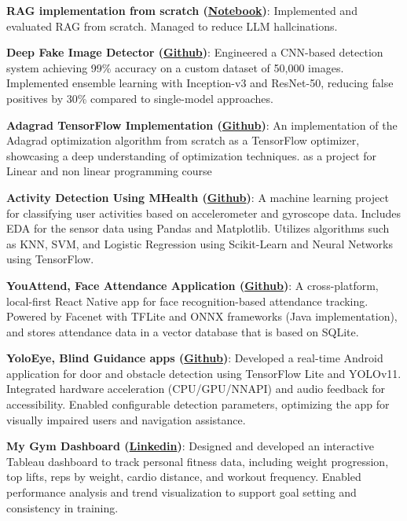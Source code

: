 \documentclass[letterpaper,11pt]{article}
\newcommand{\resumeItem}[2]{
  \item\small{
    \textbf{#1}{: #2 \vspace{-2pt}}
  }
}
\newcommand{\resumeSubItem}[2]{\resumeItem{#1}{#2}\vspace{-4pt}}
\begin{document}
 \resumeSubItem{RAG implementation from scratch (\href{https://colab.research.google.com/drive/1INoDabdT-n-vB4g11ZrA1D2VVvQX-yIs?usp=sharing}{Notebook})}
      {Implemented and evaluated RAG from scratch. Managed to reduce  LLM hallcinations.}

    \resumeSubItem{Deep Fake Image Detector (\href{https://github.com/AhmedFoda54/Deep-Fake-Classification}{Github})}
      {Engineered a CNN-based detection system achieving 99\% accuracy on a custom dataset of 50,000 images. Implemented ensemble learning with Inception-v3 and ResNet-50, reducing false positives by 30\% compared to single-model approaches.}
      

     \resumeSubItem{Adagrad TensorFlow Implementation (\href{https://github.com/marksamfd/AdaGrad-Math-303}{Github})}
      {An implementation of the Adagrad optimization algorithm from scratch as a TensorFlow optimizer, showcasing a deep understanding of optimization techniques. as a project for Linear and non linear programming course}
      \resumeSubItem{Activity Detection Using MHealth (\href{https://github.com/marksamfd/mhealth-classification}{Github})}
      {A machine learning project for classifying user activities based on accelerometer and gyroscope data. Includes EDA for the sensor data using Pandas and Matplotlib. Utilizes algorithms such as KNN, SVM, and Logistic Regression using Scikit-Learn and Neural Networks using TensorFlow.}
  
    \resumeSubItem{YouAttend, Face Attendance Application (\href{https://github.com/marksamfd/YouAttend}{Github})}
      {A cross-platform, local-first React Native app for face recognition-based attendance tracking. Powered by Facenet with TFLite and ONNX frameworks (Java implementation), and stores attendance data in a vector database that is based on SQLite.}
    \resumeSubItem{YoloEye, Blind Guidance apps (\href{https://github.com/marksamfd/YoloEye}{Github})}
      {Developed a real-time Android application for door and obstacle detection using TensorFlow Lite and YOLOv11. Integrated hardware acceleration (CPU/GPU/NNAPI) and audio feedback for accessibility. Enabled configurable detection parameters, optimizing the app for visually impaired users and navigation assistance.}
   
    \resumeSubItem{My Gym Dashboard (\href{https://www.linkedin.com/posts/marksamfd_im-happy-to-share-this-gym-dashboard-project-activity-7311015022229434368-KYmF?utm_source=share&utm_medium=member_desktop&rcm=ACoAADC1e4AB5Kixe7cxDjpvmjx8iTcK0b6p8Y8}{Linkedin})}
      {Designed and developed an interactive Tableau dashboard to track personal fitness data, including weight progression, top lifts, reps by weight, cardio distance, and workout frequency. Enabled performance analysis and trend visualization to support goal setting and consistency in training.}
   
\end{document}
